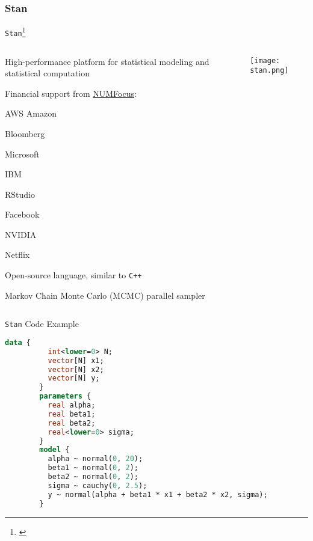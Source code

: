\subsubsection{Stan}
\begin{frame}{\texttt{Stan}\footnote{\textcite{carpenterStanProbabilisticProgramming2017}}}
	\begin{columns}
		\begin{column}{0.8\textwidth}
			\begin{vfilleditems}
				\small
				\item High-performance platform for statistical
				modeling and  statistical computation
				\item Financial support from
				\href{https://numfocus.org/}{NUMFocus}:
				\begin{vfilleditems}
					\footnotesize
					\item AWS Amazon
					\item Bloomberg
					\item Microsoft
					\item IBM
					\item RStudio
					\item Facebook
					\item NVIDIA
					\item Netflix
				\end{vfilleditems}
				\small
				\item Open-source language, similar to \texttt{C++}
				\item Markov Chain Monte Carlo (MCMC) parallel sampler
			\end{vfilleditems}
		\end{column}
		\begin{column}{0.2\textwidth}
			\centering
			\texttt{[image: stan.png]}
		\end{column}
	\end{columns}
\end{frame}

\begin{frame}[fragile]{\texttt{Stan} Code Example}
	\begin{lstlisting}[basicstyle=\footnotesize, language=Stan]
        data {
          int<lower=0> N;
          vector[N] x1;
          vector[N] x2;
          vector[N] y;
        }
        parameters {
          real alpha;
          real beta1;
          real beta2;
          real<lower=0> sigma;
        }
        model {
          alpha ~ normal(0, 20);
          beta1 ~ normal(0, 2);
          beta2 ~ normal(0, 2);
          sigma ~ cauchy(0, 2.5);
          y ~ normal(alpha + beta1 * x1 + beta2 * x2, sigma);
        }
    \end{lstlisting}
\end{frame}

